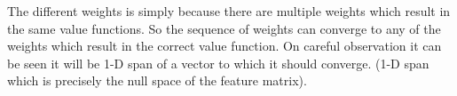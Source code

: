\documentclass{article}
\begin{document}
The different weights is simply because there are multiple weights which result in the same value functions. So the sequence of weights can converge to any of the weights which result in the correct value function. On careful observation it can be seen it will be 1-D span of a vector to which it should converge. (1-D span which is precisely the null space of the feature matrix).
\end{document}
